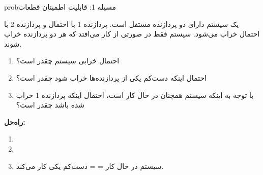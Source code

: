
\begin{PSbox}[unbreakable]{prob}{مسیله 1: قابلیت اطمینان قطعات}

یک سیستم دارای دو پردازنده مستقل است. پردازنده 1 با احتمال  و پردازنده 2 با احتمال  خراب می‌شود. سیستم فقط در صورتی از کار می‌افتد که هر دو پردازنده خراب شوند.

\begin{enumerate}
\def\labelenumi{(\PSalph{enumi})}
\tightlist
\item
  احتمال خرابی سیستم چقدر است؟
\item
  احتمال اینکه دست‌کم یکی از پردازنده‌ها خراب شود چقدر است؟
\item
  با توجه به اینکه سیستم همچنان در حال کار است، احتمال اینکه پردازنده 1 خراب شده باشد چقدر است؟
\end{enumerate}

\textbf{راه‌حل:}

\begin{enumerate}
\def\labelenumi{(\PSalph{enumi})}
\item
\item
\item
  سیستم در حال کار =  = دست‌کم یکی کار می‌کند.\PSbr{}\PSbr{}
\end{enumerate}

\end{PSbox}

